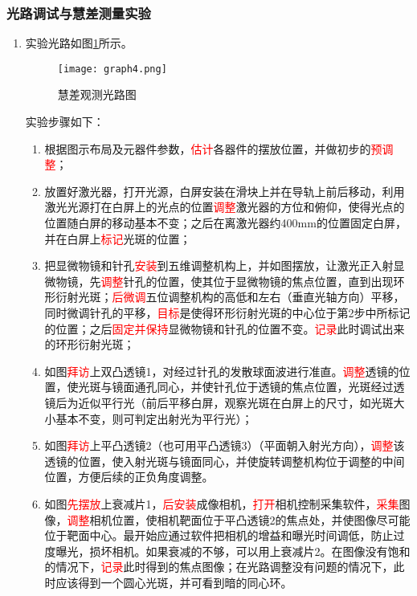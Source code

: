 \documentclass[dvipsnames, svgnames,a4paper,11pt]{article}
\begin{document}
	

	


\subsubsection{光路调试与慧差测量实验}


	\begin{enumerate}[label=\roman*.]
		\item 实验光路如图\ref{fig:graph4}所示。
			\begin{figure}[htbp]
				\centering
				\texttt{[image: graph4.png]}
				\caption{慧差观测光路图}
				\label{fig:graph4}
			\end{figure}
		
			实验步骤如下：
			\begin{enumerate}
				\item 根据图示布局及元器件参数，\textcolor{red}{估计}各器件的摆放位置，并做初步的\textcolor{red}{预调整}；
				\item 放置好激光器，打开光源，白屏安装在滑块上并在导轨上前后移动，利用激光光源打在白屏上的光点的位置\textcolor{red}{调整}激光器的方位和俯仰，使得光点的位置随白屏的移动基本不变；之后在离激光器约400mm的位置固定白屏，并在白屏上\textcolor{red}{标记}光斑的位置；
				\item 	把显微物镜和针孔\textcolor{red}{安装}到五维调整机构上，并如图摆放，让激光正入射显微物镜，先\textcolor{red}{调整}针孔的位置，使其位于显微物镜的焦点位置，直到出现环形衍射光斑；\textcolor{red}{后微调}五位调整机构的高低和左右（垂直光轴方向）平移，同时微调针孔的平移，\textcolor{red}{目标}是使得环形衍射光斑的中心位于第2步中所标记的位置；之后\textcolor{red}{固定并保持}显微物镜和针孔的位置不变。\textcolor{red}{记录}此时调试出来的环形衍射光斑；
				\item 如图\textcolor{red}{拜访}上双凸透镜1，对经过针孔的发散球面波进行准直。\textcolor{red}{调整}透镜的位置，使光斑与镜面通孔同心，并使针孔位于透镜的焦点位置，光斑经过透镜后为近似平行光（前后平移白屏，观察光斑在白屏上的尺寸，如光斑大小基本不变，则可判定出射光为平行光）；
				\item 如图\textcolor{red}{拜访}上平凸透镜2（也可用平凸透镜3）（平面朝入射光方向），\textcolor{red}{调整}该透镜的位置，使入射光斑与镜面同心，并使旋转调整机构位于调整的中间位置，方便后续的正负角度调整。
				\item 如图\textcolor{red}{先摆放}上衰减片1，\textcolor{red}{后安装}成像相机，\textcolor{red}{打开}相机控制采集软件，\textcolor{red}{采集}图像，\textcolor{red}{调整}相机位置，使相机靶面位于平凸透镜2的焦点处，并使图像尽可能位于靶面中心。最开始应通过软件把相机的增益和曝光时间调低，防止过度曝光，损坏相机。如果衰减的不够，可以用上衰减片2。在图像没有饱和的情况下，\textcolor{red}{记录}此时得到的焦点图像；在光路调整没有问题的情况下，此时应该得到一个圆心光斑，并可看到暗的同心环。

\end{enumerate}
\end{enumerate}
\end{document}
